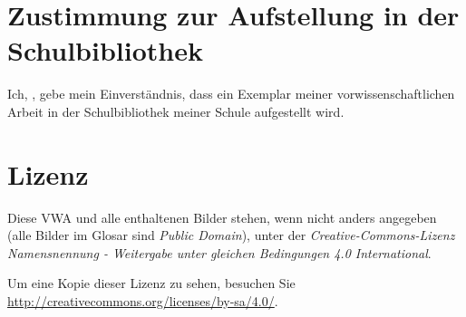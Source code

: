 \section*{Zustimmung zur Aufstellung in der Schulbibliothek}
Ich, \myauthor, gebe mein Einverständnis, dass ein Exemplar meiner vorwissenschaftlichen Arbeit in der Schulbibliothek meiner Schule aufgestellt wird.
\vfill
{}
\vfill

\section*{Lizenz}

Diese VWA und alle enthaltenen Bilder stehen, wenn nicht anders angegeben (alle Bilder im Glosar sind \emph{Public Domain}), unter der \emph{Creative-Commons-Lizenz Namensnennung - Weitergabe unter gleichen Bedingungen 4.0 International}.

Um eine Kopie dieser Lizenz zu sehen, besuchen Sie \newline \href{creativecommons.org/licenses/by-sa/4.0/}{http://creativecommons.org/licenses/by-sa/4.0/}.
\begin{center}
\ccbysa
\end{center}


